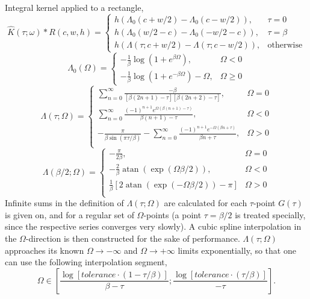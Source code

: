 \documentclass[]{article}
\DeclareMathOperator{\atan}{atan}
\begin{document}
Integral kernel applied to a rectangle,
\begin{equation}
	\hat K(\tau;\omega)*R(c,w,h) = \left\{ 
	\begin{array}{ll}
	h(\Lambda_0(c + w/2) - \Lambda_0(c - w/2)), & \tau = 0 \\
	h(\Lambda_0(w/2 - c) - \Lambda_0(-w/2-c)), & \tau = \beta \\
	h(\Lambda(\tau;c + w/2) - \Lambda(\tau;c - w/2)), & \mathrm{otherwise}
	\end{array}\right.
\end{equation}
\begin{equation}
	\Lambda_0(\Omega) = \left\{ 
	\begin{array}{ll}
	-\frac{1}{\beta}\log(1 + e^{\beta\Omega}), & \Omega < 0 \\
	-\frac{1}{\beta}\log(1 + e^{-\beta\Omega}) - \Omega, & \Omega \ge 0
	\end{array}\right.
\end{equation}
\begin{equation}
	\Lambda(\tau;\Omega) = \left\{
	\begin{array}{ll}
	\sum_{n=0}^\infty\frac{-\beta}{[\beta(2n+1)-\tau][\beta(2n+2)-\tau]},
	& \Omega = 0 \\
	\sum_{n=0}^\infty\frac{(-1)^{n+1}e^{\Omega(\beta(n+1)-\tau)}}{\beta(n+1)-\tau},
	& \Omega < 0 \\
	-\frac{\pi}{\beta \sin(\pi\tau/\beta)}
	-\sum_{n=0}^\infty\frac{(-1)^{n+1}e^{-\Omega(\beta n +\tau)}}{\beta n+\tau},
	& \Omega > 0 \\
	\end{array}
	\right.
\end{equation}
\begin{equation}
	\Lambda(\beta/2;\Omega) = \left\{
	\begin{array}{ll}
	-\frac{\pi}{2\beta},& \Omega = 0 \\
	-\frac{2}{\beta}\atan(\exp(\Omega\beta/2)),& \Omega < 0 \\
	\frac{1}{\beta}[2\atan(\exp(-\Omega\beta/2)) - \pi]& \Omega > 0 \\
	\end{array}
	\right.
\end{equation}
Infinite sums in the definition of $\Lambda(\tau;\Omega)$ are calculated for each $\tau$-point $G(\tau)$ is given on, and for a regular set of $\Omega$-points (a point $\tau = \beta/2$ is treated specially, since the respective series converges very slowly). A cubic spline interpolation in the $\Omega$-direction is then constructed for the sake of performance. $\Lambda(\tau;\Omega)$ approaches its known $\Omega\to-\infty$ and $\Omega\to+\infty$ limits exponentially, so that one can use the following interpolation
segment,
\begin{equation}
	\Omega \in [\frac{\log[tolerance\cdot(1-\tau/\beta)]}{\beta-\tau};
				\frac{\log[tolerance\cdot(\tau/\beta)]}{-\tau}].
\end{equation}
\end{document}

